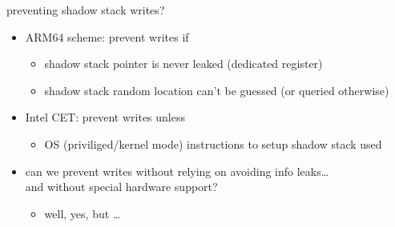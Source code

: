 \begin{frame}{preventing shadow stack writes?}
\begin{itemize}
\item ARM64 scheme: prevent writes if
    \begin{itemize}
    \item shadow stack pointer is never leaked (dedicated register)
    \item shadow stack random location can't be guessed (or queried otherwise)
    \end{itemize}
\item Intel CET: prevent writes unless
    \begin{itemize}
    \item OS (priviliged/kernel mode) instructions to setup shadow stack used
    \end{itemize}
\vspace{.5cm}
\item can we prevent writes without relying on avoiding info leaks\ldots \\
      and without special hardware support?
      \begin{itemize}
      \item well, yes, but \ldots
      \end{itemize}
\end{itemize}
\end{frame}



